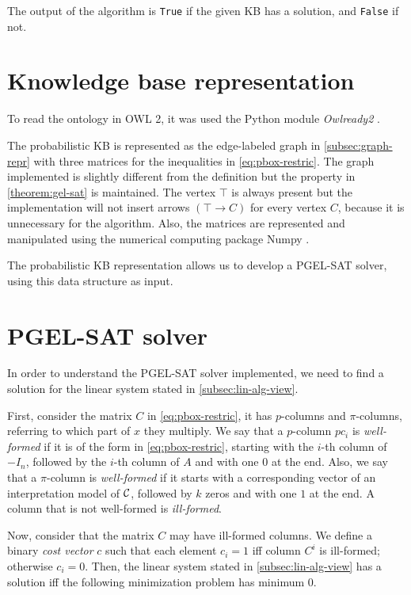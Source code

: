 The output of the algorithm is \texttt{True} if the given KB has a solution, and \texttt{False} if not.

\section{Knowledge base representation}
To read the ontology in OWL 2, it was used the Python module \textit{Owlready2} \citep{lamy2017owlready}.


The probabilistic KB is represented as the edge-labeled graph in \cref{subsec:graph-repr} with three matrices for the inequalities in \cref{eq:pbox-restric}. The graph implemented is slightly different from the definition but the property in \cref{theorem:gel-sat} is maintained. The vertex $\top$ is always present but the implementation will not insert arrows $(\top \to C)$ for every vertex $C$, because it is unnecessary for the algorithm. Also, the matrices are represented and manipulated using the numerical computing package Numpy \citep{numpy}.

The probabilistic KB representation allows us to develop a PGEL-SAT solver, using this data structure as input.

\section{PGEL-SAT solver}
\label{sec:pgelsatsolver}

In order to understand the PGEL-SAT solver implemented, we need to find a solution for the linear system stated in \cref{subsec:lin-alg-view}.

First, consider the matrix $C$ in \cref{eq:pbox-restric}, it has $p$-columns and $\pi$-columns, referring to which part of $x$ they multiply. We say that a $p$-column $pc_i$ is \emph{well-formed} if it is of the form in \cref{eq:pbox-restric}, starting with the $i$-th column of $-I_n$, followed by the $i$-th column of $A$ and with one $0$ at the end. Also, we say that a $\pi$-column is \emph{well-formed} if it starts with a corresponding vector of an interpretation model of $\mathcal{C}$, followed by $k$ zeros and with one $1$ at the end. A column that is not well-formed is \emph{ill-formed}.

Now, consider that the matrix $C$ may have ill-formed columns. We define a binary \emph{cost vector} $c$ such that each element $c_i = 1$ iff column $C^i$ is ill-formed; otherwise $c_i = 0$. Then, the linear system stated in \cref{subsec:lin-alg-view} has a solution iff the following minimization problem has minimum 0.

